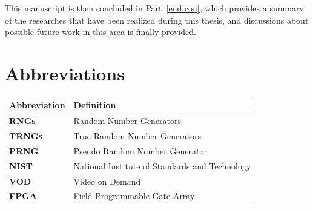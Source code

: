 This manuscript is then concluded in Part~\ref{end con}, which provides a summary of the researches that have been realized
during this thesis, and discussions about possible future work in this area is finally provided.

\section{Abbreviations}
\begin{tabular}{ll}\toprule
\textbf{Abbreviation}& \textbf{Definition}\\\hline
\textbf{RNGs}& Random Number Generators\\
\textbf{TRNGs}& True Random Number Generators\\
\textbf{PRNG}& Pseudo Random Number Generator\\
\textbf{NIST}& National Institute of Standards and Technology\\
\textbf{VOD}&Video on Demand\\
\textbf{FPGA}& Field Programmable Gate Array\\ \bottomrule
\end{tabular}
 

